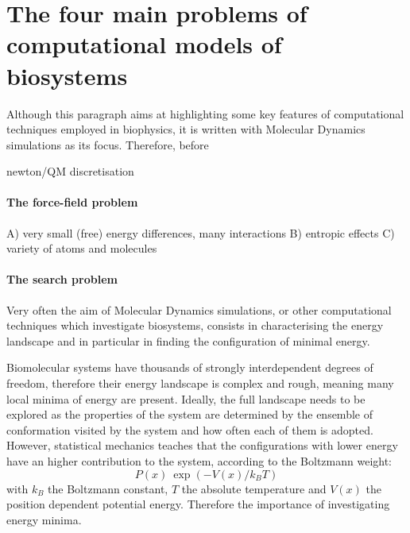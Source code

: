\section{The four main problems of computational models of biosystems}


Although this paragraph aims at highlighting some key features of computational techniques employed in biophysics, it is written with Molecular Dynamics simulations as its focus. Therefore, before 

newton/QM
discretisation

\paragraph{The force-field problem}
A) very small (free) energy differences, many interactions
B) entropic effects
C) variety of atoms and molecules


\paragraph{The search problem}
Very often the aim of Molecular Dynamics simulations, or other computational techniques which investigate biosystems, consists in characterising the energy landscape and in particular in finding the configuration of minimal energy.

Biomolecular systems have thousands of strongly interdependent degrees of freedom, therefore their energy landscape is complex and rough, meaning many local minima of energy are present. Ideally, the full landscape needs to be explored as the properties of the system are determined by the ensemble of conformation visited by the system and how often each of them is adopted. However, statistical mechanics teaches that the configurations with lower energy have an higher contribution to the system, according to the Boltzmann weight:
\begin{equation}
P(x) ~ \exp(-V(x)/k_BT)
\end{equation}
with $k_B$ the Boltzmann constant, $T$ the absolute temperature and $V(x)$ the position dependent potential energy. Therefore the importance of investigating energy minima.

